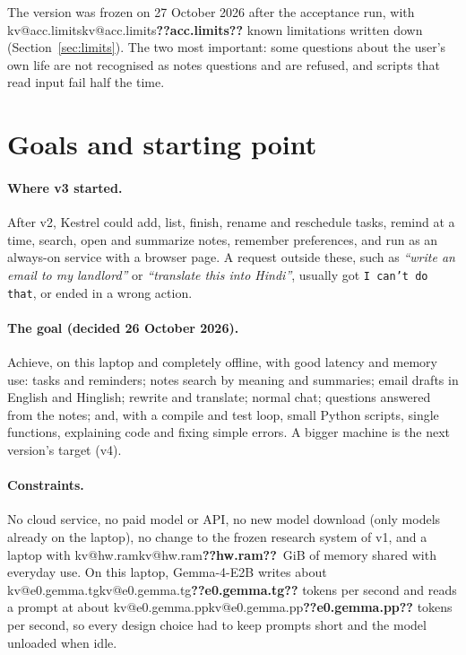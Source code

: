 \documentclass[11pt,a4paper]{article}
\makeatletter
\DeclareRobustCommand{\kv}[1]{\ifcsname kv@#1\endcsname\csname kv@#1\endcsname\else\textbf{??#1??}\fi}
\newcommand{\req}[1]{\textit{``#1''}}
\newcommand{\ans}[1]{\texttt{\small #1}}
\makeatother
\begin{document}
The version was frozen on 27 October 2026 after the acceptance run, with \kv{acc.limits} known limitations written down
(Section~\ref{sec:limits}). The two most important: some questions about the user's own life are not recognised as
notes questions and are refused, and scripts that read input fail half the time.

\section{Goals and starting point}

\paragraph{Where v3 started.} After v2, Kestrel could add, list, finish, rename and reschedule tasks, remind at a
time, search, open and summarize notes, remember preferences, and run as an always-on service with a browser page. A
request outside these, such as \req{write an email to my landlord} or \req{translate this into Hindi},
usually got \ans{I can't do that}, or ended in a wrong action.

\paragraph{The goal (decided 26 October 2026).} Achieve, on this laptop and completely offline, with good latency and
memory use: tasks and reminders; notes search by meaning and summaries; email drafts in English and Hinglish; rewrite and
translate; normal chat; questions answered from the notes; and, with a compile and test loop, small Python scripts,
single functions, explaining code and fixing simple errors. A bigger machine is the next version's target (v4).

\paragraph{Constraints.} No cloud service, no paid model or API, no new model download (only models already on the
laptop), no change to the frozen research system of v1, and a laptop with \kv{hw.ram}~GiB of memory shared with everyday
use. On this laptop, Gemma-4-E2B writes about \kv{e0.gemma.tg} tokens per second and reads a prompt at about
\kv{e0.gemma.pp} tokens per second, so every design choice had to keep prompts short and the model unloaded when idle.
\end{document}
